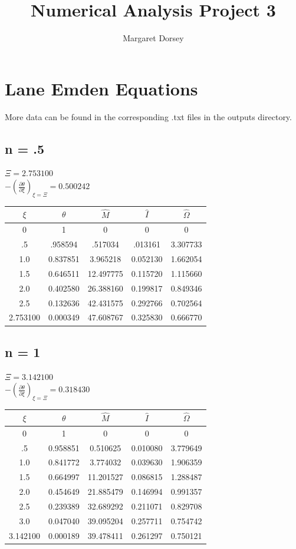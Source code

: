 \documentclass[11pt]{article} %
\title{Numerical Analysis Project 3}
\author{Margaret Dorsey}
\newcommand{\pder}[2][]{\frac{\partial#1}{\partial#2}}
\begin{document}
\maketitle

\section*{Lane Emden Equations}

More data can be found in the corresponding .txt files in the outputs directory. \\

\subsection*{n = .5}

$\Xi = 2.753100$ \\
$-\left(\pder[\theta]{\xi}\right)_{\xi = \Xi} = 0.500242$\\

\begin{tabular}{| c | c c c c |}
\hline
$\xi$ & $\theta$ & $\hat{M}$ &  $\hat{I}$  & $\hat{\Omega}$ \\
\hline
0 & 1 & 0 & 0 & 0 \\
.5 & .958594 & .517034 & .013161 & 3.307733\\
1.0 & 0.837851 &  3.965218 & 0.052130 & 1.662054\\
1.5 & 0.646511 & 12.497775 & 0.115720 & 1.115660\\
2.0 & 0.402580 & 26.388160 & 0.199817 & 0.849346\\
2.5 & 0.132636 & 42.431575 & 0.292766 & 0.702564\\
2.753100 & 0.000349 & 47.608767 & 0.325830 & 0.666770\\
\hline
\end{tabular}

\subsection*{n = 1}
$\Xi = 3.142100$ \\
$-\left(\pder[\theta]{\xi}\right)_{\xi = \Xi} =0.318430$\\

\begin{tabular}{| c | c c c c |}
\hline
$\xi$ & $\theta$ & $\hat{M}$ &  $\hat{I}$  & $\hat{\Omega}$ \\
\hline
0 & 1 & 0 & 0 & 0 \\
.5 & 0.958851 & 0.510625 & 0.010080 & 3.779649\\
1.0 & 0.841772 & 3.774032 &0.039630 & 1.906359\\
1.5 &0.664997 & 11.201527 &0.086815 & 1.288487\\
2.0 & 0.454649 & 21.885479 & 0.146994 & 0.991357\\
2.5 & 0.239389 & 32.689292 & 0.211071 & 0.829708\\
3.0 & 0.047040 & 39.095204 & 0.257711 & 0.754742\\
3.142100 & 0.000189 & 39.478411 & 0.261297 & 0.750121\\
\hline
\end{tabular}
\end{document}

